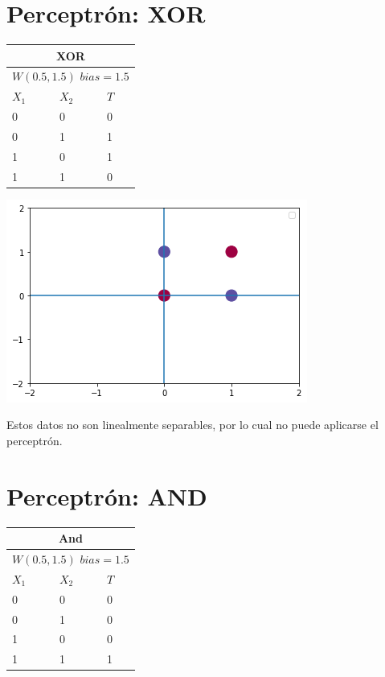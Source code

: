 \documentclass{article}
\begin{document}
\section{Perceptrón: XOR}
{
\begin{tabular}{ |p{3cm}|p{3cm}|p{3cm}| }
 \hline
 \multicolumn{3}{|c|}{XOR} \\
\hline
 \multicolumn{3}{|c|}{$W(0.5, 1.5)$  $bias = 1.5$}\\
 \hline
$X_1$ & $X_2$ & $T$\\
 \hline
0 & 0 & 0 \\
0 & 1 & 1 \\
1 & 0 & 1 \\
1 & 1 & 0\\
 \hline
\end{tabular}


\includegraphics[scale=0.5]{xor.png}

Estos datos no son linealmente separables, por lo cual no puede aplicarse el perceptrón.
\section{Perceptrón: AND}

{
\begin{tabular}{ |p{3cm}|p{3cm}|p{3cm}| }
 \hline
 \multicolumn{3}{|c|}{And} \\
\hline
 \multicolumn{3}{|c|}{$W(0.5, 1.5)$  $bias = 1.5$}\\
 \hline
$X_1$ & $X_2$ & $T$\\
 \hline
0 & 0 & 0 \\
0 & 1 & 0 \\
1 & 0 & 0 \\
1 & 1 & 1\\
 \hline
\end{tabular}

}}
\end{document}
